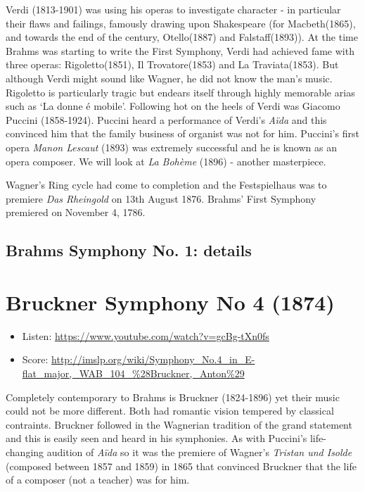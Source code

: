 Verdi (1813-1901) was using his operas to investigate character - in particular their flaws and failings, famously drawing upon Shakespeare (for Macbeth(1865), and towards the end of the century, Otello(1887) and Falstaff(1893)). 
At the time Brahms was starting to write the First Symphony, Verdi had achieved fame with three operas: Rigoletto(1851), Il Trovatore(1853) and La Traviata(1853). But although Verdi might sound like Wagner, he did not know the man's music. Rigoletto is particularly tragic but endears itself through highly memorable arias such as `La donne \'e mobile'. Following hot on the heels of Verdi was Giacomo Puccini (1858-1924). Puccini heard a performance of Verdi's \textit{A\"ida} and this convinced him that the family business of organist was not for him. Puccini's first opera \textit{Manon Lescaut} (1893) was extremely successful and he is known as an opera composer. We will look at \textit{La Boh\`eme} (1896) - another masterpiece. 

Wagner's Ring cycle had come to completion and the Festspielhaus was to premiere \textit{Das Rheingold} on 13th August 1876. Brahms' First Symphony premiered on November 4, 1786. 

\subsection{Brahms Symphony No. 1: details} 


\section{Bruckner Symphony No 4 (1874)}
\begin{itemize}
\item Listen: \url{https://www.youtube.com/watch?v=gcBg-tXn0fs}
\item Score: \url{http://imslp.org/wiki/Symphony_No.4_in_E-flat_major,_WAB_104_%28Bruckner,_Anton%29}
\end{itemize}

Completely contemporary to Brahms is Bruckner (1824-1896) yet their music could not be more different. Both had romantic vision tempered by classical contraints. Bruckner followed in the Wagnerian tradition of the grand statement and this is easily seen and heard in his symphonies. As with Puccini's life-changing audition of \textit{A\"ida} so it was the premiere of Wagner's \textit{Tristan und Isolde} (composed between 1857 and 1859) in 1865 that convinced Bruckner that the life of a composer (not a teacher) was for him. 

